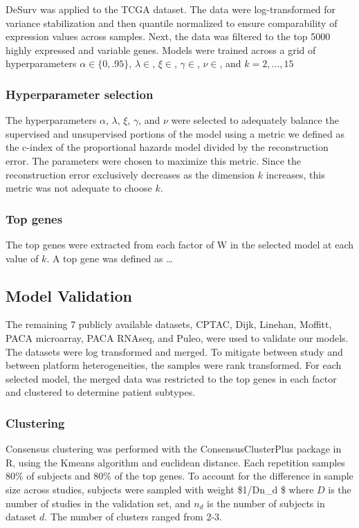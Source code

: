 \documentclass[9pt,twocolumn,twoside,]{pnas-new}
\begin{document}
DeSurv was applied to the TCGA dataset. The data were log-transformed
for variance stabilization and then quantile normalized to ensure
comparability of expression values across samples. Next, the data was
filtered to the top 5000 highly expressed and variable genes. Models
were trained across a grid of hyperparameters \(\alpha \in \{0,.95\}\),
\(\lambda \in\), \(\xi \in\), \(\gamma \in\), \(\nu \in\), and
\(k = 2,\dots,15\)

\subsubsection{Hyperparameter selection}

The hyperparameters \(\alpha\), \(\lambda\), \(\xi\), \(\gamma\), and
\(\nu\) were selected to adequately balance the supervised and
unsupervised portions of the model using a metric we defined as the
c-index of the proportional hazards model divided by the reconstruction
error. The parameters were chosen to maximize this metric. Since the
reconstruction error exclusively decreases as the dimension \(k\)
increases, this metric was not adequate to choose \(k\).

\subsubsection{Top genes}

The top genes were extracted from each factor of W in the selected model
at each value of \(k\). A top gene was defined as \ldots{}

\subsection{Model Validation}

The remaining 7 publicly available datasets, CPTAC, Dijk, Linehan,
Moffitt, PACA microarray, PACA RNAseq, and Puleo, were used to validate
our models. The datasets were log transformed and merged. To mitigate
between study and between platform heterogeneities, the samples were
rank transformed. For each selected model, the merged data was
restricted to the top genes in each factor and clustered to determine
patient subtypes.

\subsubsection{Clustering}

Consensus clustering was performed with the ConsensusClusterPlus package
in R, using the Kmeans algorithm and euclidean distance. Each repetition
samples 80\% of subjects and 80\% of the top genes. To account for the
difference in sample size across studies, subjects were sampled with
weight \$1/Dn\_d \$ where \(D\) is the number of studies in the
validation set, and \(n_d\) is the number of subjects in dataset \(d\).
The number of clusters ranged from 2-3.
\end{document}
